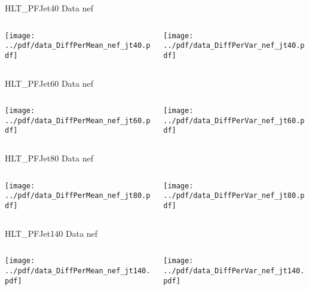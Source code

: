 \documentclass[9pt]{beamer}
\begin{document}
\begin{frame}[t]{HLT\_PFJet40 Data nef}
\begin{columns}[T]
  \begin{column}{.5\textwidth}
  \texttt{[image: ../pdf/data\_DiffPerMean\_nef\_jt40.pdf]}
  \end{column}
  \begin{column}{.5\textwidth}
  \texttt{[image: ../pdf/data\_DiffPerVar\_nef\_jt40.pdf]}
  \end{column}
\end{columns}
\end{frame}

\begin{frame}[t]{HLT\_PFJet60 Data nef}
\begin{columns}[T]
  \begin{column}{.5\textwidth}
  \texttt{[image: ../pdf/data\_DiffPerMean\_nef\_jt60.pdf]}
  \end{column}
  \begin{column}{.5\textwidth}
  \texttt{[image: ../pdf/data\_DiffPerVar\_nef\_jt60.pdf]}
  \end{column}
\end{columns}
\end{frame}

\begin{frame}[t]{HLT\_PFJet80 Data nef}
\begin{columns}[T]
  \begin{column}{.5\textwidth}
  \texttt{[image: ../pdf/data\_DiffPerMean\_nef\_jt80.pdf]}
  \end{column}
  \begin{column}{.5\textwidth}
  \texttt{[image: ../pdf/data\_DiffPerVar\_nef\_jt80.pdf]}
  \end{column}
\end{columns}
\end{frame}

\begin{frame}[t]{HLT\_PFJet140 Data nef}
\begin{columns}[T]
  \begin{column}{.5\textwidth}
  \texttt{[image: ../pdf/data\_DiffPerMean\_nef\_jt140.pdf]}
  \end{column}
  \begin{column}{.5\textwidth}
  \texttt{[image: ../pdf/data\_DiffPerVar\_nef\_jt140.pdf]}
  \end{column}
\end{columns}
\end{frame}
\end{document}
